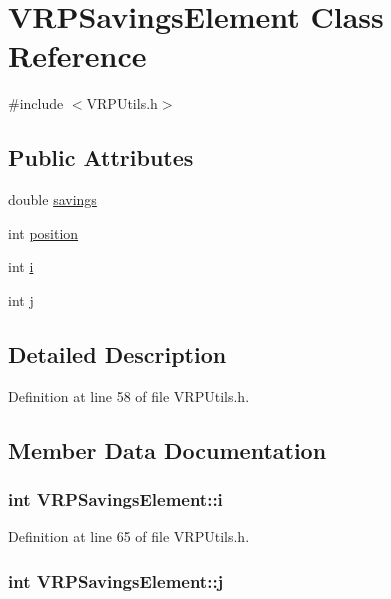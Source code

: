 \hypertarget{class_v_r_p_savings_element}{
\section{VRPSavingsElement Class Reference}
\label{class_v_r_p_savings_element}
}


{\ttfamily \#include $<$VRPUtils.h$>$}

\subsection*{Public Attributes}
\begin{DoxyCompactItemize}
\item 
double \hyperlink{class_v_r_p_savings_element_aa66efafd0412c0554a02e4f66dc445a7}{savings}
\item 
int \hyperlink{class_v_r_p_savings_element_a66c3d14231c356805a718cabb71ed768}{position}
\item 
int \hyperlink{class_v_r_p_savings_element_a6541f16c86abea060cda0399092ddb62}{i}
\item 
int \hyperlink{class_v_r_p_savings_element_ae5cee8435a6a64655c25091051dc3bf2}{j}
\end{DoxyCompactItemize}


\subsection{Detailed Description}


Definition at line 58 of file VRPUtils.h.



\subsection{Member Data Documentation}
\hypertarget{class_v_r_p_savings_element_a6541f16c86abea060cda0399092ddb62}{
\subsubsection[{i}]{\setlength{\rightskip}{0pt plus 5cm}int {\bf VRPSavingsElement::i}}}
\label{class_v_r_p_savings_element_a6541f16c86abea060cda0399092ddb62}


Definition at line 65 of file VRPUtils.h.

\hypertarget{class_v_r_p_savings_element_ae5cee8435a6a64655c25091051dc3bf2}{
\subsubsection[{j}]{\setlength{\rightskip}{0pt plus 5cm}int {\bf VRPSavingsElement::j}}}
\label{class_v_r_p_savings_element_ae5cee8435a6a64655c25091051dc3bf2}


